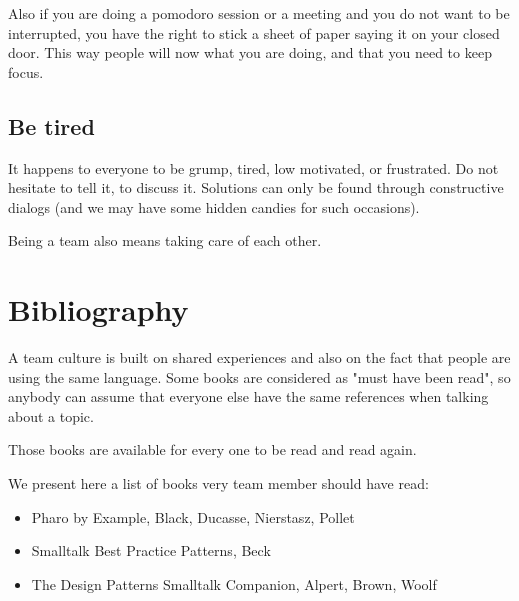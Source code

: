 \documentclass[10pt]{article}
\begin{document}
Also if you are doing a pomodoro session or a meeting and you do not want to be interrupted, you have the right to stick a sheet of paper saying it on your closed door. This way people will now what you are doing, and that you need to keep focus.

\subsection{Be tired}
It happens to everyone to be grump, tired, low motivated, or frustrated. Do not hesitate to tell it, to discuss it. Solutions can only be found through constructive dialogs (and we may have some hidden candies for such occasions).

Being a team also means taking care of each other.

\section{Bibliography}
A team culture is built on shared experiences and also on the fact that people are using the same language.
Some books are considered as "must have been read", so anybody can assume that everyone else have the same references when talking about a topic.

Those books are available for every one to be read and read again.

We present here a list of books very team member should have read:
\begin{itemize}
	\item Pharo by Example, Black, Ducasse, Nierstasz, Pollet
	\item Smalltalk Best Practice Patterns, Beck
	\item The Design Patterns Smalltalk Companion, Alpert, Brown, Woolf
\end{itemize}
\end{document}
